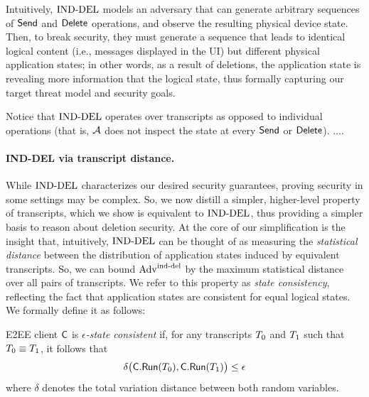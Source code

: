 

Intuitively, $\textnormal{IND-DEL}$ models an adversary that can generate arbitrary sequences of $\mathsf{Send}$ and $\mathsf{Delete}$ operations, and observe the resulting physical device state. Then, to break security, they must generate a sequence that leads to identical logical content (i.e., messages displayed in the UI) but different physical application states; in other words, as a result of deletions, the application state is revealing more information that the logical state, thus formally capturing our target threat model and security goals.


Notice that $\textnormal{IND-DEL}$ operates over transcripts as opposed to individual operations (that is, $\mathcal{A}$ does not inspect the state at every $\mathsf{Send}$ or $\mathsf{Delete}$). ....

\paragraph{IND-DEL via transcript distance.} While $\textnormal{IND-DEL}$ characterizes our desired security guarantees, proving security in some settings may be complex. So, we now distill a simpler, higher-level property of transcripts, which we show is equivalent to $\textnormal{IND-DEL}$, thus providing a simpler basis to reason about deletion security. At the core of our simplification is the insight that, intuitively, $\textnormal{IND-DEL}$ can be thought of as measuring the \emph{statistical distance} between the distribution of application states induced by equivalent transcripts. So, we can bound $\textnormal{Adv}^{\textup{ind-del}}_{}$ by the maximum statistical distance over all pairs of transcripts. We refer to this property as \emph{state consistency}, reflecting the fact that application states are consistent for equal logical states. We formally define it as follows:
\begin{definition}\label{def:state-consistency}
    E2EE client $\mathsf{C}$ is \emph{$\epsilon$-state consistent} if, for any transcripts $T_0$ and $T_1$ such that $T_0 \equiv T_1$, it follows that 
    \[\delta\big(\mathsf{C}.\mathsf{Run}(T_0), \mathsf{C}.\mathsf{Run}(T_1)\big) \leq \epsilon\]
    where $\delta$ denotes the total variation distance between both random variables.
\end{definition}

